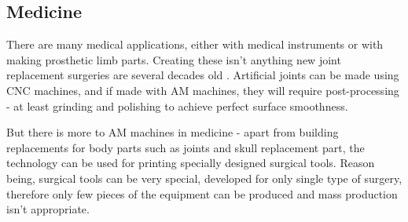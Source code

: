 \documentclass[a4paper, 11pt, reqno]{report}
\begin{document}
\subsection{Medicine}
There are many medical applications, either with medical instruments or with making prosthetic limb parts. Creating these isn't anything new joint replacement surgeries are several decades old \cite{JointReplacement}. Artificial joints can be made using CNC machines, and if made with AM machines, they will require post-processing - at least grinding and polishing to achieve perfect surface smoothness.

	But there is more to AM machines in medicine - apart from building replacements for body parts such as joints and skull replacement part, the technology can be used for printing specially designed surgical tools. Reason being, surgical tools can be very special, developed for only single type of surgery, therefore only few pieces of the equipment can be produced and mass production isn't appropriate.
	
\end{document}
